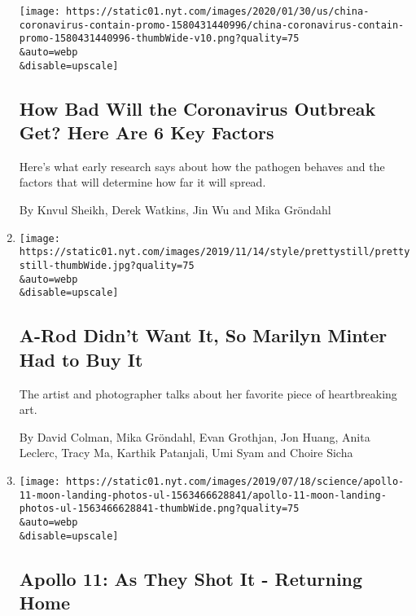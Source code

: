 \begin{enumerate}
  \texttt{[image: https://static01.nyt.com/images/2020/01/30/us/china-coronavirus-contain-promo-1580431440996/china-coronavirus-contain-promo-1580431440996-thumbWide-v10.png?quality=75\\\&auto=webp\\\&disable=upscale]}

  \hypertarget{how-bad-will-the-coronavirus-outbreak-get-here-are-6-key-factors}{%
  \subsection{How Bad Will the Coronavirus Outbreak Get? Here Are 6 Key
  Factors}\label{how-bad-will-the-coronavirus-outbreak-get-here-are-6-key-factors}}

  Here's what early research says about how the pathogen behaves and the
  factors that will determine how far it will spread.

  By Knvul Sheikh, Derek Watkins, Jin Wu and Mika Gröndahl
\item
  \href{/interactive/2019/11/14/style/possessed-kara-walker.html}{}

  \texttt{[image: https://static01.nyt.com/images/2019/11/14/style/prettystill/prettystill-thumbWide.jpg?quality=75\\\&auto=webp\\\&disable=upscale]}

  \hypertarget{a-rod-didnt-want-it-so-marilyn-minter-had-to-buy-it}{%
  \subsection{A-Rod Didn't Want It, So Marilyn Minter Had to Buy
  It}\label{a-rod-didnt-want-it-so-marilyn-minter-had-to-buy-it}}

  The artist and photographer talks about her favorite piece of
  heartbreaking art.

  By David Colman, Mika Gröndahl, Evan Grothjan, Jon Huang, Anita
  Leclerc, Tracy Ma, Karthik Patanjali, Umi Syam and Choire Sicha
\item
  \href{/interactive/2019/07/18/science/apollo-11-moon-earth-photos-ul.html}{}

  \texttt{[image: https://static01.nyt.com/images/2019/07/18/science/apollo-11-moon-landing-photos-ul-1563466628841/apollo-11-moon-landing-photos-ul-1563466628841-thumbWide.png?quality=75\\\&auto=webp\\\&disable=upscale]}

  \hypertarget{apollo-11-as-they-shot-it---returning-home}{%
  \subsection{Apollo 11: As They Shot It - Returning
  Home}\label{apollo-11-as-they-shot-it---returning-home}}


\end{enumerate}
